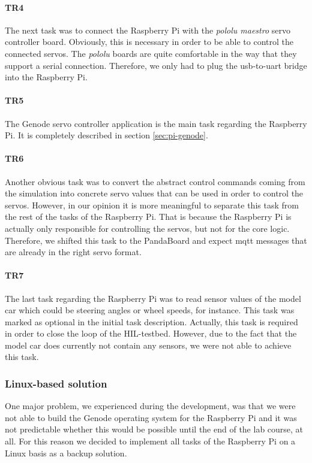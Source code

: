 \paragraph{\textbf{TR4}} The next task was to connect the Raspberry Pi with the \textit{pololu maestro} servo controller board. Obviously, this is necessary in order to be able to control the connected servos. The \textit{pololu} boards are quite comfortable in the way that they support a serial connection. Therefore, we only had to plug the usb-to-uart bridge into the Raspberry Pi.

\paragraph{\textbf{TR5}} The Genode servo controller application is the main task regarding the Raspberry Pi. It is completely described in section \ref{sec:pi-genode}.

\paragraph{\textbf{TR6}} Another obvious task was to convert the abstract control commands coming from the simulation into concrete servo values that can be used in order to control the servos. However, in our opinion it is more meaningful to separate this task from the rest of the tasks of the Raspberry Pi. That is because the Raspberry Pi is actually only responsible for controlling the servos, but not for the core logic. Therefore, we shifted this task to the PandaBoard and expect mqtt messages that are already in the right servo format. 

\paragraph{\textbf{TR7}} The last task regarding the Raspberry Pi was to read sensor values of the model car which could be steering angles or wheel speeds, for instance. This task was marked as optional in the initial task description. Actually, this task is required in order to close the loop of the HIL-testbed. However, due to the fact that the model car does currently not contain any sensors, we were not able to achieve this task.


\subsubsection{Linux-based solution}
\label{sec:pi-linux}
One major problem, we experienced during the development, was that we were not able to build the Genode operating system for the Raspberry Pi and it was not predictable whether this would be possible until the end of the lab course, at all. For this reason we decided to implement all tasks of the Raspberry Pi on a Linux basis as a backup solution. \\

